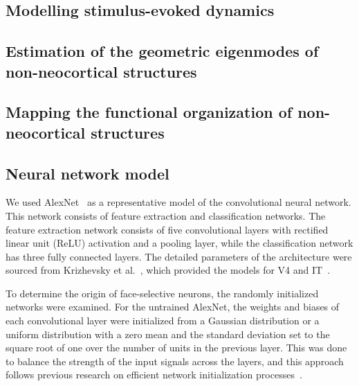 \documentclass[sn-mathphys-num]{sn-jnl}%
\theoremstyle{thmstyleone}%
\theoremstyle{thmstyletwo}%
\theoremstyle{thmstylethree}%
\begin{document}
\subsection{Modelling stimulus-evoked dynamics} \label{sec:modelling_stimulus}


\subsection{Estimation of the geometric eigenmodes of non-neocortical structures} \label{sec:geometric_estimation}


\subsection{Mapping the functional organization of non-neocortical structures} \label{sec:functional_mapping}


\subsection{Neural network model} \label{sec:nn}
We used AlexNet~\cite{krizhevsky2012imagenet} as a representative model of the convolutional neural network.
This network consists of feature extraction and classification networks.
The feature extraction network consists of five convolutional layers with rectified linear unit (ReLU) activation and a pooling layer, while the classification network has three fully connected layers.
The detailed parameters of the architecture were sourced from Krizhevsky et al.~\cite{krizhevsky2012imagenet}, which provided the models for V4 and IT~\cite{cadieu2014deep}.


To determine the origin of face-selective neurons, the randomly initialized networks were examined.
For the untrained AlexNet, the weights and biases of each convolutional layer were initialized from a Gaussian distribution or a uniform distribution with a zero mean and the standard deviation set to the square root of one over the number of units in the previous layer.
This was done to balance the strength of the input signals across the layers, 
and this approach follows previous research on efficient network initialization processes~\cite{lecun2002efficient}.
\end{document}
